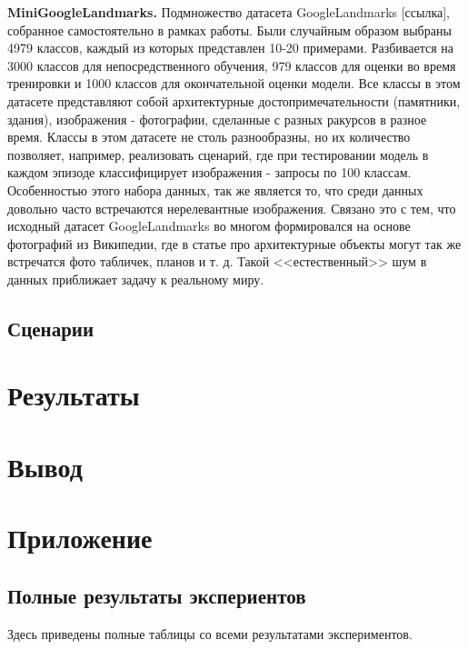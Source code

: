 \documentclass[a4paper, 12pt]{report}
\begin{document}
\textbf {MiniGoogleLandmarks.} Подмножество датасета GoogleLandmarks [ссылка], собранное самостоятельно в рамках работы. Были случайным образом выбраны 4979 классов, каждый из которых представлен 10-20 примерами. Разбивается на 3000 классов для непосредственного обучения, 979 классов для оценки во время тренировки и 1000 классов для окончательной оценки модели. Все классы в этом датасете представляют собой архитектурные достопримечательности (памятники, здания), изображения - фотографии, сделанные с разных ракурсов в разное время. Классы в этом датасете не столь разнообразны, но их количество позволяет, например, реализовать сценарий, где при тестировании модель в каждом эпизоде классифицирует изображения - запросы по 100 классам. Особенностью этого набора данных, так же является то, что среди данных довольно часто встречаются нерелевантные изображения. Связано это с тем, что исходный датасет GoogleLandmarks во многом формировался на основе фотографий из Википедии, где в статье про архитектурные объекты могут так же встречатся фото табличек, планов и т. д. Такой <<естественный>> шум в данных приближает задачу к реальному миру.

\section {Сценарии}

\chapter{Результаты}

\chapter{Вывод}

\chapter{Приложение}

\section {Полные результаты экспериентов}

Здесь приведены полные таблицы со всеми результатами экспериментов.
\end{document}
